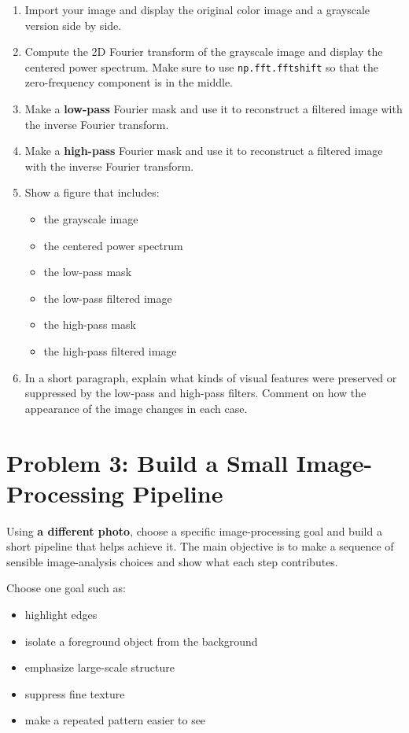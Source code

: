 \documentclass[11pt]{article}
\begin{document}
\begin{enumerate}[label=\alph*)]
  \item Import your image and display the original color image and a grayscale version side by side.

  \item Compute the 2D Fourier transform of the grayscale image and display the centered power spectrum. Make sure to use \texttt{np.fft.fftshift} so that the zero-frequency component is in the middle.

  \item Make a \textbf{low-pass} Fourier mask and use it to reconstruct a filtered image with the inverse Fourier transform.

  \item Make a \textbf{high-pass} Fourier mask and use it to reconstruct a filtered image with the inverse Fourier transform.

  \item Show a figure that includes:
  \begin{itemize}
    \item the grayscale image
    \item the centered power spectrum
    \item the low-pass mask
    \item the low-pass filtered image
    \item the high-pass mask
    \item the high-pass filtered image
  \end{itemize}

  \item In a short paragraph, explain what kinds of visual features were preserved or suppressed by the low-pass and high-pass filters. Comment on how the appearance of the image changes in each case.
\end{enumerate}

\section*{Problem 3: Build a Small Image-Processing Pipeline}

Using \textbf{a different photo}, choose a specific image-processing goal and build a short pipeline that helps achieve it. The main objective is to make a sequence of sensible image-analysis choices and show what each step contributes.

Choose one goal such as:
\begin{itemize}
  \item highlight edges
  \item isolate a foreground object from the background
  \item emphasize large-scale structure
  \item suppress fine texture
  \item make a repeated pattern easier to see
\end{itemize}
\end{document}
